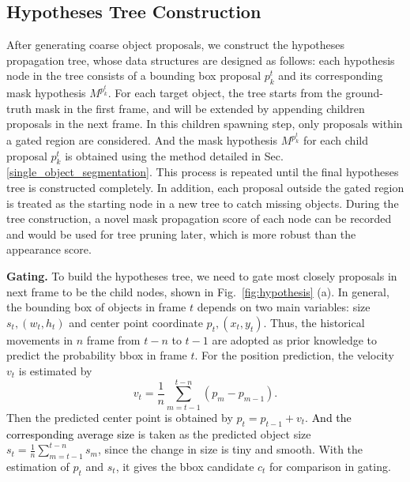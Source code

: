 \documentclass[10pt,twocolumn,letterpaper]{article}
\newcommand{\ldz}[1]{\textcolor{black}{#1}}
\begin{document}
\subsection{Hypotheses Tree Construction}
\label{proposal_tree}
\vspace{-5pt}

After generating coarse object proposals, we construct the hypotheses propagation tree, whose data structures are designed as follows: each hypothesis node in the tree consists of a bounding box proposal $p_k^{t}$ and its corresponding mask hypothesis $M^{p_k^{t}}$. 
For each target object, the tree starts from the ground-truth mask in the first frame, and will be extended by appending children proposals in the next frame. 
In this children spawning step, only proposals within a gated region are considered. 
And the mask hypothesis $M^{p_k^{t}}$ for each child proposal $p_k^{t}$ is obtained using the method detailed in Sec. \ref{single_object_segmentation}. 
This process is repeated until the final hypotheses tree is constructed completely. 
In addition, each proposal outside the gated region is treated as the starting node in a new tree to catch missing objects. 
During the tree construction, a novel mask propagation score of each node can be recorded and would be used for tree pruning later, which is more robust than the appearance score. 



\textbf{Gating.} To build the hypotheses tree, we need to gate most closely proposals in next frame to be the child nodes, shown in Fig.~\ref{fig:hypothesis} (a). 
In general, the bounding box of objects in frame $t$ depends on two main variables: size $s_t,(w_t,h_t)$ and center point coordinate $p_t,(x_t,y_t)$. Thus, the historical movements in $n$ frame from ${t-n}$ to ${t-1}$ are adopted as prior knowledge to predict the probability bbox in frame $t$. For the position prediction, the velocity $v_t$ is estimated by 
\begin{equation}
{v_t} = \frac{1}{n}\sum\limits_{m = t - 1}^{t - n} {({p_m} - {p_{m - 1}})}.
\end{equation}
Then the predicted center point is obtained by $p_t=p_{t-1}+v_t$.
\ldz{And the corresponding average size} is taken as the predicted object size ${s_t} = \frac{1}{n}\sum\limits_{m = t - 1}^{t - n} {{s_m}}$, since the change in size is tiny and smooth. With the estimation of $p_t$ and $s_t$, it gives the bbox candidate $c_t$ for comparison in gating.
\end{document}
